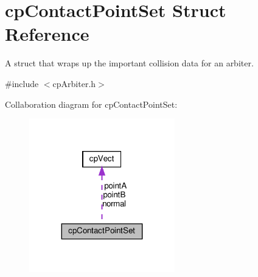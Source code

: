 \hypertarget{structcpContactPointSet}{}\section{cp\+Contact\+Point\+Set Struct Reference}
\label{structcpContactPointSet}


A struct that wraps up the important collision data for an arbiter.  




{\ttfamily \#include $<$cp\+Arbiter.\+h$>$}



Collaboration diagram for cp\+Contact\+Point\+Set\+:
\nopagebreak
\begin{figure}[H]
\begin{center}
\leavevmode
\includegraphics[width=179pt]{structcpContactPointSet__coll__graph}
\end{center}
\end{figure}
